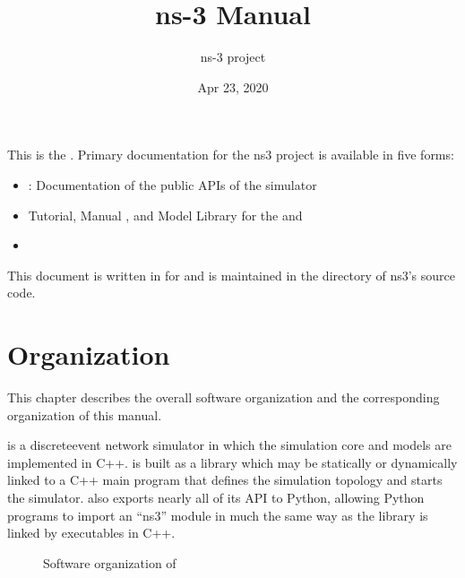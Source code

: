 \documentclass[letterpaper,10pt,english]{sphinxmanual}
\title{ns-3 Manual}
\date{Apr 23, 2020}
\author{ns-3 project}
\renewcommand{\sphinxcode}[1]{\texttt{\small{#1}}}
\begin{document}
\pagestyle{empty}
\sphinxmaketitle
\pagestyle{plain}
\sphinxtableofcontents
\pagestyle{normal}
\label{\detokenize{index::doc}}


This is the . Primary documentation for the ns\sphinxhyphen{}3 project is
available in five forms:
\begin{itemize}
\item {} 
: Documentation of the public APIs of the simulator

\item {} 
Tutorial, Manual , and Model Library for the  and 

\item {} 

\end{itemize}

This document is written in  for  and is maintained in the
\sphinxcode{} directory of ns\sphinxhyphen{}3’s source code.


\chapter{Organization}
\label{\detokenize{organization:organization}}\label{\detokenize{organization::doc}}
This chapter describes the overall  software organization and the
corresponding organization of this manual.

 is a discrete\sphinxhyphen{}event network simulator in which the simulation core
and models are implemented in C++.  is built as a library which may be
statically or dynamically linked to a C++ main program that defines the
simulation topology and starts the simulator.  also exports nearly all
of its API to Python, allowing Python programs to import an “ns3” module in
much the same way as the  library is linked by executables in C++.

\begin{figure}[htbp]
\centering
\capstart

\noindent{}
\caption{Software organization of }\label{\detokenize{organization:id1}}\label{\detokenize{organization:software-organization}}\end{figure}
\end{document}

